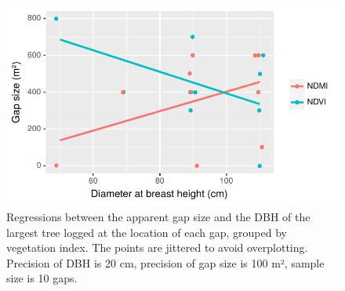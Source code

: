 \documentclass[a4paper,12pt]{scrbook}
\begin{document}
\begin{figure}
  \centering
  \includegraphics{thesis-figures/18-gap-vs-dbh}
  \caption{Regressions between the apparent gap size and the \ac{DBH} of the largest tree logged at the location of each gap, grouped by vegetation index. The points are jittered to avoid overplotting. Precision of \ac{DBH} is 20 cm, precision of gap size is 100 m², sample size is 10 gaps.}
  \label{fig-gap-vs-dbh}
\end{figure}
\end{document}
